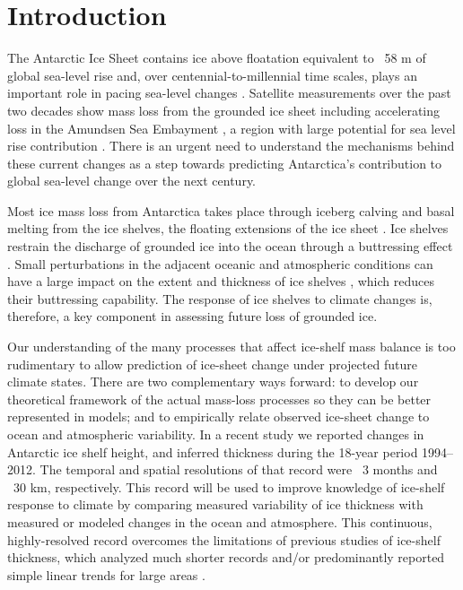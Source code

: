 \section{Introduction}

\noindent
The Antarctic Ice Sheet contains ice above floatation equivalent to ~58 m of global sea-level rise \parencite{Fretwell2013} and, over centennial-to-millennial time scales, plays an important role in pacing sea-level changes \parencite{Alley2005}. Satellite measurements over the past two decades show mass loss from the grounded ice sheet \parencite{Shepherd2012} including accelerating loss in the Amundsen Sea Embayment \parencite{Sutterley2014}, a region with large potential for sea level rise contribution \parencite{Rignot2014, Joughin2014}. There is an urgent need to understand the mechanisms behind these current changes as a step towards predicting Antarctica's contribution to global sea-level change over the next century. 

Most ice mass loss from Antarctica takes place through iceberg calving and basal melting from the ice shelves, the floating extensions of the ice sheet \parencite{Depoorter2013, Joughin2012, Rignot2013}. Ice shelves restrain the discharge of grounded ice into the ocean through a buttressing effect \parencite{Joughin2011, Schoof2007}. Small perturbations in the adjacent oceanic and atmospheric conditions can have a large impact on the extent and thickness of ice shelves \parencite{Dutrieux2014, Rignot2004, Scambos2004}, which reduces their buttressing capability. The response of ice shelves to climate changes is, therefore, a key component in assessing future loss of grounded ice.

Our understanding of the many processes that affect ice-shelf mass balance is too rudimentary to allow prediction of ice-sheet change under projected future climate states. There are two complementary ways forward: to develop our theoretical framework of the actual mass-loss processes so they can be better represented in models; and to empirically relate observed ice-sheet change to ocean and atmospheric variability. In a recent study \parencite{Paolo2015} we reported changes in Antarctic ice shelf height, and inferred thickness during the 18-year period 1994--2012. The temporal and spatial resolutions of that record were ~3 months and ~30 km, respectively. This record will be used to improve knowledge of ice-shelf response to climate by comparing measured variability of ice thickness with measured or modeled changes in the ocean and atmosphere. This continuous, highly-resolved record overcomes the limitations of previous studies of ice-shelf thickness, which analyzed much shorter records and/or predominantly reported simple linear trends for large areas \parencite{Pritchard2012, Shepherd2010, Zwally2005}.

